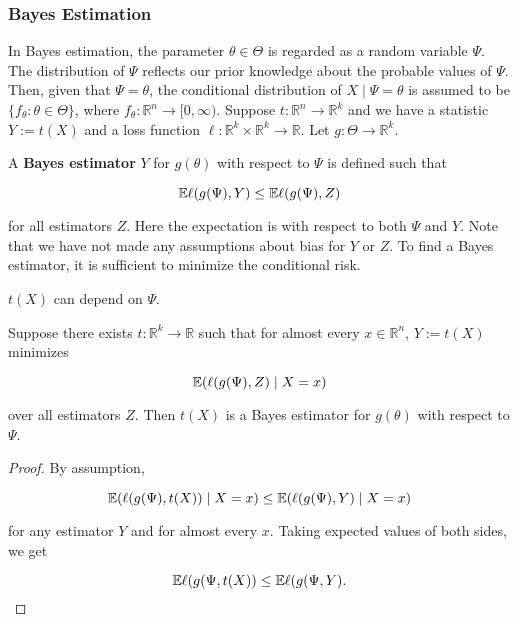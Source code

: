 \subsubsection{Bayes Estimation}

In Bayes estimation, the parameter \(\theta \in \Theta\) is regarded as a random variable \(\Psi\). The distribution of \(\Psi\) reflects our prior knowledge about the probable values of \(\Psi\). Then, given that \(\Psi = \theta\), the conditional distribution of \(X \mid \Psi= \theta\) is assumed to be \(\{f_\theta: \theta \in \Theta \}\), where \(f_\theta: \mathbb{R}^n \to [0, \infty)\). Suppose \(t: \mathbb{R}^n \to \mathbb{R}^k\) and we have a statistic \(Y := t(X)\) and a loss function \(\ell: \mathbb{R}^k \times \mathbb{R}^k \to \mathbb{R}\). Let \(g: \Theta \to \mathbb{R}^k\).

\begin{definition} A \textbf{Bayes estimator} \(Y\) for \(g(\theta)\) with respect to \(\Psi\) is defined such that

\[
\E \ell(g(\Psi), Y) \leq \E \ell(g(\Psi), Z)
\]

for all estimators \(Z\). Here the expectation is with respect to both \(\Psi\) and \(Y\). Note that we have not made any assumptions about bias for \(Y\) or \(Z\). To find a Bayes estimator, it is sufficient to minimize the conditional risk.

\end{definition}

\begin{remark} \(t(X)\) can depend on \(\Psi\).

\end{remark}

\begin{proposition} Suppose there exists \(t: \mathbb{R}^k \to \mathbb{R}\) such that for almost every \(x \in \mathbb{R}^n\), \(Y := t(X) \) minimizes

\[
\E( \ell(g(\Psi), Z) \mid X = x)
\]

over all estimators \(Z\). Then \(t(X)\) is a Bayes estimator for \(g(\theta)\) with respect to \(\Psi\).

\end{proposition}

\begin{proof} By assumption,

\[
\E( \ell(g(\Psi), t(X)) \mid X = x) \leq \E( \ell(g(\Psi), Y) \mid X = x)
\]

for any estimator \(Y\) and for almost every \(x\). Taking expected values of both sides, we get

\[
\E \ell(g(\Psi, t(X)) \leq \E \ell(g(\Psi, Y). 
\]

\end{proof}

